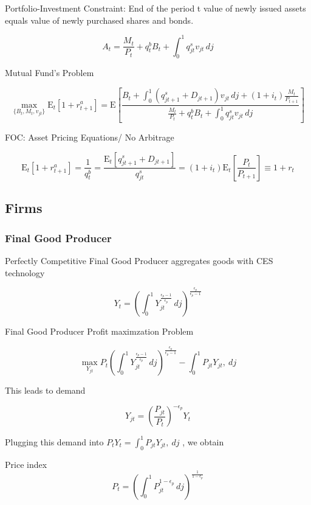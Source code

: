 \documentclass[titlepage]{\econtex}\providecommand{\texname}{BufferStockTheory}
\begin{document}
 Portfolio-Investment Constraint: End of the period t value of newly issued assets equals value of newly purchased shares and bonds. 

$$A_{t} = \frac{M_{t}}{P_{t}} +q^{b}_{t} B_{t} + \int_{0}^{1} q^{s}_{jt}\mathit{v}_{jt}\,dj$$


Mutual Fund's Problem

$$\max_{\{B_{t}, M_{t} , \mathit{v}_{jt} \}} \mathrm{E}_{t}\left[1+r^{a}_{t+1} \right] = \mathrm{E}\left[ \frac{ B_{t} + \int_{0}^{1} (q^{s}_{jt+1}+ D_{jt+1})\mathit{v}_{jt} \, dj +(1+i_{t}) \frac{M_{t}}{P_{t+1}}}{\frac{M_{t}}{P_{t}} +q^{b}_{t} B_{t} + \int_{0}^{1} q^{s}_{jt}\mathit{v}_{jt}\,dj} \right]$$

 
 FOC: Asset Pricing Equations/ No Arbitrage

$$ \mathrm{E}_{t}\left[1+r^{a}_{t+1}\right]= \frac{1}{q^{b}_{t}}  =\frac{\mathrm{E}_{t}\left[q^{s}_{jt+1} + D_{jt+1} \right]}{q^{s}_{jt}} = (1+i_{t}) \mathrm{E}_{t}\left[\frac{P_{t}}{P_{t+1}}\right] \equiv 1 +r_{t}$$



\hypertarget{Firms}{}
\subsection{Firms}

\hypertarget{Final Good Producer}{}
\subsubsection{Final Good Producer}

Perfectly Competitive Final Good Producer aggregates goods with CES technology

$$ Y_{t} = \left(\int_{0}^{1} Y_{jt}^{\frac{\epsilon_{p}-1}{\epsilon_{p}}}\, dj\right)^{\frac{\epsilon_{p}}{\epsilon_{p}-1}}$$

Final Good Producer Profit maximzation Problem

$$ \max_{Y_{jt}} P_{t} \left(\int_{0}^{1} Y_{jt}^{\frac{\epsilon_{p}-1}{\epsilon_{p}}}\, dj\right)^{\frac{\epsilon_{p}}{\epsilon_{p}-1}} - \int_{0}^{1} P_{jt} Y_{jt} ,\ dj $$


This leads to demand

$$ Y_{jt} = \left(\frac {P_{jt}}{P_{t}}\right)^{- \epsilon_{p}} Y_{t}$$

Plugging this demand into $ P_{t}Y_{t} = \int_{0}^{1} P_{jt} Y_{jt} ,\ dj$ , we obtain

Price index $$P_{t} = \left(\int_{0}^{1} P_{jt}^{1-\epsilon_{p}}\,dj \right )^{\frac{1}{1-\epsilon_{p}}}$$
\end{document}
